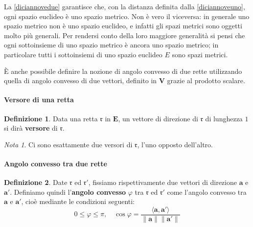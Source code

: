 \documentclass{article}
\theoremstyle{plain}
\theoremstyle{definition}
\newtheorem{defn}{Definizione}[section]
\theoremstyle{remark}
\newtheorem{note}{Nota}
\begin{document}
La \ref{diciannovedue} garantisce che, con la distanza definita dalla \ref{diciannoveuno}, ogni spazio euclideo è uno spazio 
metrico. Non è vero il viceversa: in generale uno spazio metrico non è uno spazio euclideo, e infatti gli spazi metrici sono 
oggetti molto più generali. Per rendersi conto della loro maggiore generalità si pensi che ogni sottoinsieme di uno spazio 
metrico è ancora uno spazio metrico; in particolare tutti i sottoinsiemi di uno spazio euclideo $E$ sono spazi metrici.

\vspace{10pt}

È anche possibile definire la nozione di angolo convesso di due rette utilizzando quella di angolo convesso di due vettori, 
definito in $\mathbf{V}$ grazie al prodotto scalare. 

\vspace{10pt}

\paragraph{Versore di una retta}
\begin{bxthm}
\begin{defn}
Data una retta $\mathfrak{r}$ in $\mathbf{E}$, un vettore di direzione di 
$\mathfrak{r}$ di lunghezza $1$ si dirà \textbf{versore} di $\mathfrak{r}$. 
\end{defn}
\end{bxthm}

\vspace{10pt}

\begin{note}
    Ci sono esattamente due versori di $\mathfrak{r}$, l'uno opposto dell'altro.    
\end{note}

\vspace{10pt}

\paragraph{Angolo convesso tra due rette}
\begin{bxthm}
\begin{defn}
Date $\mathfrak{r}$ ed $\mathfrak{r}'$, fissiamo rispettivamente due vettori di direzione 
$\mathbf{a}$ e $\mathbf{a}'$. Definiamo quindi l'\textbf{angolo convesso} 
$\varphi$ tra $\mathfrak{r}$ ed $\mathfrak{r}'$ come l'angolo convesso tra $\mathbf{a}$ e $\mathbf{a}'$, cioè mediante le condizioni 
seguenti:
\[0 \leq \varphi \leq \pi, \quad \cos \varphi = \frac{\langle \mathbf{a}, \mathbf{a}' \rangle}{\|\mathbf{a}\| \|\mathbf{a}'\|}\]
\end{defn}
\end{bxthm}
\end{document}
